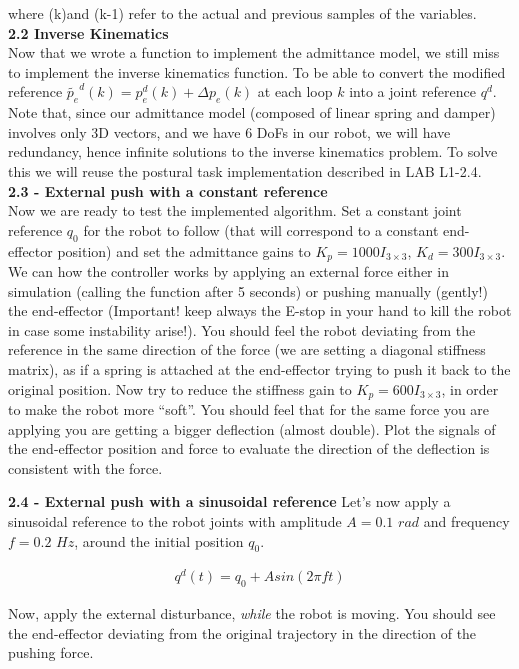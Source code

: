 \documentclass[11pt]{article}
\begin{document}
where (k)and (k-1) refer to the actual and previous samples of the variables. \\

\textbf{2.2 Inverse Kinematics}\\
Now that we wrote a function to implement the admittance model, we still miss to implement the inverse kinematics function. To be able to convert the modified reference $\tilde{p_e}^d(k) = p_e^d(k) +  \Delta p_e(k)$  at each loop $k$ into a joint reference $q^d$. Note that, since our admittance model (composed of linear spring and damper)  involves only 3D vectors, and we have 6 DoFs in our robot, we will have redundancy, hence  infinite solutions to the inverse kinematics problem. To solve this we will reuse the postural task implementation described in LAB L1-2.4.\\


\textbf{2.3 - External push with a constant reference}\\
Now we are ready to test the implemented algorithm. Set  a constant joint reference $q_0$  for the robot to follow (that will correspond to a constant end-effector position) and set the admittance gains to $K_p = 1000I_{3\times3}$,  $K_d = 300I_{3\times3}$. We can how the controller works by applying an external force either in simulation (calling the function  after 5 seconds) or pushing manually (gently!) the end-effector (Important! keep always the E-stop in your hand to kill the robot in case some instability arise!). You should feel the robot deviating from the reference in the same direction of the force (we are setting a diagonal stiffness matrix), as if a spring is attached at the end-effector trying to push it back to the original position. 
Now try to reduce the stiffness gain to $K_p = 600I_{3\times3}$, in order to make the robot more ``soft''. You should feel that for the same force you are applying you are getting a bigger deflection (almost double).
Plot the signals of the end-effector position and force to evaluate the direction of the deflection is consistent with the force.

\textbf{2.4 - External push with a sinusoidal reference}
Let's now apply a sinusoidal reference to the robot joints  with amplitude $A= 0.1$ $rad$ and frequency $f = 0.2$ $Hz$, around the initial position $q_0$.

\begin{align*}
q^d(t) = q_0 + Asin(2\pi f t )
\end{align*} 

Now, apply the external disturbance, \textit{while} the robot is moving. You should see the end-effector deviating from the original trajectory in the direction of the pushing force. \\
 
\end{document}

